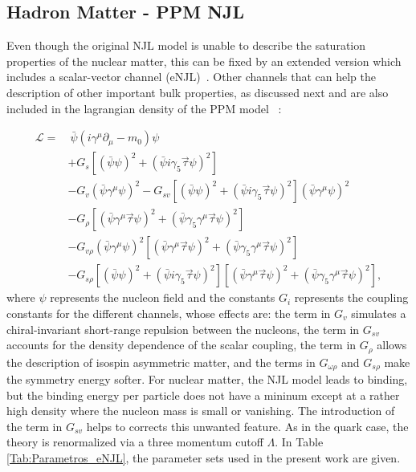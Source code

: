 \documentclass[prc, reprint, amsmath, floatfix,10pt]{revtex4-1}
\begin{document}
\subsection{Hadron Matter - PPM NJL}\label{NJLHM} 

Even though the original NJL model is unable to describe the
saturation properties of the nuclear matter, this can be fixed by an
extended version which includes a scalar-vector channel
(eNJL)~\cite{Koch1987}. Other channels that can help the description
of other important bulk properties, as discussed next and are also
included in the lagrangian density of the PPM model ~\cite{Pais2016}:

\begin{equation}\label{Eq:Lagrangiana_eNLJ_Pais}
\begin{split}
	\mathscr{L} =&~ \bar{\psi}(i\gamma^\mu\partial_\mu - m_0)\psi \\
	& + G_s[(\bar{\psi}\psi)^2 + (\bar{\psi}i\gamma_5\vec{\tau}\psi)^2] \\
	& - G_v(\bar{\psi}\gamma^\mu\psi)^2 - G_{sv}[(\bar{\psi}\psi)^2 + (\bar{\psi}i\gamma_5\vec{\tau}\psi)^2](\bar{\psi}\gamma^\mu\psi)^2 \\
	& - G_\rho[(\bar{\psi}\gamma^\mu\vec{\tau}\psi)^2 + (\bar{\psi}\gamma_5\gamma^\mu\vec{\tau}\psi)^2] \\
	& - G_{v\rho}(\bar{\psi}\gamma^\mu\psi)^2[(\bar{\psi}\gamma^\mu\vec{\tau}\psi)^2 + (\bar{\psi}\gamma_5\gamma^\mu\vec{\tau}\psi)^2] \\
	& - G_{s\rho} [(\bar{\psi}\psi)^2 + (\bar{\psi}i\gamma_5\vec{\tau}\psi)^2][(\bar{\psi}\gamma^\mu\vec{\tau}\psi)^2 + (\bar{\psi}\gamma_5\gamma^\mu\vec{\tau}\psi)^2],
\end{split}
\end{equation}
%
where $\psi$ represents the nucleon field and the constants $G_i$
represents the coupling constants for the different channels, whose
effects are: the term in $G_v$ simulates a chiral-invariant
short-range repulsion between the nucleons, the term in $G_{sv}$
accounts for the density dependence of the scalar coupling, the term
in $G_\rho$ allows the description of isospin asymmetric matter, and
the terms in $G_{\omega\rho}$ and $G_{s\rho}$ make the symmetry energy
softer. For nuclear matter, the NJL model leads to binding, but the
binding energy per particle does not have a mininum except at a rather
high density where the nucleon mass is small or vanishing. The
introduction of the term in $G_{sv}$ helps to corrects this unwanted feature.
As in the quark case, the theory is renormalized via a three momentum cutoff
$\Lambda$. In Table \ref {Tab:Parametros_eNJL}, the parameter sets
used in the present work are given.
\end{document}
